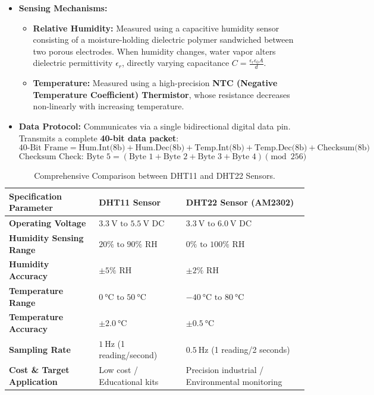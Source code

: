 \begin{itemize}
    \item \textbf{Sensing Mechanisms:}
    \begin{itemize}
        \item \textbf{Relative Humidity:} Measured using a capacitive humidity sensor consisting of a moisture-holding dielectric polymer sandwiched between two porous electrodes. When humidity changes, water vapor alters dielectric permittivity $\epsilon_r$, directly varying capacitance $C = \frac{\epsilon_r \epsilon_0 A}{d}$.
        \item \textbf{Temperature:} Measured using a high-precision \textbf{NTC (Negative Temperature Coefficient) Thermistor}, whose resistance decreases non-linearly with increasing temperature.
    \end{itemize}
    \item \textbf{Data Protocol:} Communicates via a single bidirectional digital data pin. Transmits a complete \textbf{40-bit data packet}:
    \begin{equation*}
        \text{40-Bit Frame} = \text{Hum.Int(8b)} + \text{Hum.Dec(8b)} + \text{Temp.Int(8b)} + \text{Temp.Dec(8b)} + \text{Checksum(8b)}
    \end{equation*}
    \begin{equation*}
        \text{Checksum Check: } \text{Byte 5} = (\text{Byte 1} + \text{Byte 2} + \text{Byte 3} + \text{Byte 4}) \pmod{256}
    \end{equation*}
\end{itemize}

\begin{table}[htbp]
\centering
\small
\begin{tabularx}{\textwidth}{lXX}
\toprule
\textbf{Specification Parameter} & \textbf{DHT11 Sensor} & \textbf{DHT22 Sensor (AM2302)} \\
\midrule
\textbf{Operating Voltage} & $\SI{3.3}{\volt}\text{ to }\SI{5.5}{\volt}$ DC & $\SI{3.3}{\volt}\text{ to }\SI{6.0}{\volt}$ DC \\
\textbf{Humidity Sensing Range} & $20\%\text{ to }90\%\text{ RH}$ & $0\%\text{ to }100\%\text{ RH}$ \\
\textbf{Humidity Accuracy} & $\pm 5\%\text{ RH}$ & $\pm 2\%\text{ RH}$ \\
\textbf{Temperature Range} & $\SI{0}{\celsius}\text{ to }\SI{50}{\celsius}$ & $\SI{-40}{\celsius}\text{ to }\SI{80}{\celsius}$ \\
\textbf{Temperature Accuracy} & $\pm \SI{2.0}{\celsius}$ & $\pm \SI{0.5}{\celsius}$ \\
\textbf{Sampling Rate} & $\SI{1}{\hertz}$ (1 reading/second) & $\SI{0.5}{\hertz}$ (1 reading/2 seconds) \\
\textbf{Cost \& Target Application} & Low cost / Educational kits & Precision industrial / Environmental monitoring \\
\bottomrule
\end{tabularx}
\caption{Comprehensive Comparison between DHT11 and DHT22 Sensors.}
\label{tab:dht-comparison}
\end{table}

